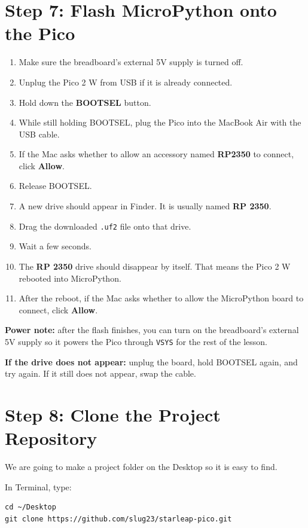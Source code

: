 \documentclass[11pt,letterpaper]{article}
\begin{document}
\section*{Step 7: Flash MicroPython onto the Pico}
\begin{enumerate}
    \item Make sure the breadboard's external 5V supply is turned off.
    \item Unplug the Pico 2 W from USB if it is already connected.
    \item Hold down the \textbf{BOOTSEL} button.
    \item While still holding BOOTSEL, plug the Pico into the MacBook Air with the USB cable.
    \item If the Mac asks whether to allow an accessory named \textbf{RP2350} to connect, click \textbf{Allow}.
    \item Release BOOTSEL.
    \item A new drive should appear in Finder. It is usually named \textbf{RP 2350}.
    \item Drag the downloaded \texttt{.uf2} file onto that drive.
    \item Wait a few seconds.
    \item The \textbf{RP 2350} drive should disappear by itself. That means the Pico 2 W rebooted into MicroPython.
    \item After the reboot, if the Mac asks whether to allow the MicroPython board to connect, click \textbf{Allow}.
\end{enumerate}

\textbf{Power note:} after the flash finishes, you can turn on the breadboard's external 5V supply so it powers the Pico through \texttt{VSYS} for the rest of the lesson.

\textbf{If the drive does not appear:} unplug the board, hold BOOTSEL again, and try again. If it still does not appear, swap the cable.

\section*{Step 8: Clone the Project Repository}
We are going to make a project folder on the Desktop so it is easy to find.

In Terminal, type:

\begin{verbatim}
cd ~/Desktop
git clone https://github.com/slug23/starleap-pico.git
\end{verbatim}
\end{document}

